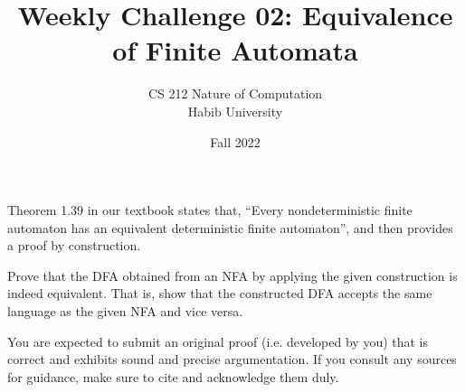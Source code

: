 \documentclass[a4paper]{exam}
\title{Weekly Challenge 02: Equivalence of Finite Automata}
\author{CS 212 Nature of Computation\\Habib University}
\date{Fall 2022}
\begin{document}
\maketitle

\begin{questions}
  

  Theorem 1.39 in our textbook states that, ``Every nondeterministic finite automaton has an equivalent deterministic finite automaton'', and then provides a proof by construction.

  Prove that the DFA obtained from an NFA by applying the given construction is indeed equivalent. That is, show that the constructed DFA accepts the same language as the given NFA and vice versa.
  
  You are expected to submit an original proof (i.e. developed by you) that is correct and exhibits sound and precise argumentation. If you consult any sources for guidance, make sure to cite and acknowledge them duly.
  
  \begin{solution}
  \end{solution}
\end{questions}
\end{document}
